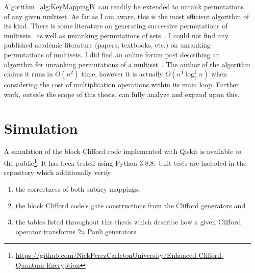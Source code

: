 Algorithm~\ref{alg:KeyMappingB} can readily be extended to unrank permutations of any given multiset. As far as I am aware, this is the most efficient algorithm of its kind. There is some literature on generating successive permutations of multisets~\cite{takaoka2015multi} as well as unranking permutations of sets~\cite{myrvold2001ranking}. I could not find any published academic literature (papers, textbooks, etc.) on unranking permutations of multisets. I did find an online forum post describing an algorithm for unranking permutations of a multiset~\cite{unrankingMultisetStackOverflow}. The author of the algorithm claims it runs in $O\left(n^2\right)$ time, however it is actually $O\left(n^3 \log_2^2 n\right)$ when considering the cost of multiplication operations within its main loop. Further work, outside the scope of this thesis, can fully analyze and expand upon this.

\section{Simulation}
A simulation of the block Clifford code implemented with Qiskit is available to the public\footnote{\url{https://github.com/NickPerezCarletonUniversity/Enhanced-Clifford-Quantum-Encryption}}. It has been tested using Python 3.8.8. Unit tests are included in the repository which additionally verify
\begin{enumerate}
    \item the correctness of both subkey mappings,
    \item the block Clifford code's gate constructions from the Clifford generators and
    \item the tables listed throughout this thesis which describe how a given Clifford operator transforms $2n$ Pauli generators.
\end{enumerate}
